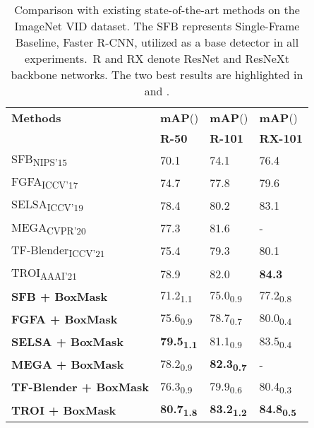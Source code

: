 \documentclass[10pt,twocolumn,letterpaper]{article}
\begin{document}
\begin{table}
\begin{center}
    \small
    \begin{tabular}{llll}
    \toprule\noalign{\smallskip}
      \textbf{Methods} &  \textbf{mAP}() &  \textbf{mAP}() &  \textbf{mAP}()\\ &\textbf{R-50} &\textbf{R-101} &\textbf{RX-101} \\
    \noalign{\smallskip}
    \hline
    SFB\textsubscript{NIPS'15}\cite{ren2015faster}  & 70.1 & 74.1 & 76.4 \\
    FGFA\textsubscript{ICCV'17}\cite{zhu2017flow}  & 74.7& 77.8 & 79.6 \\
    SELSA\textsubscript{ICCV'19}\cite{wu2019sequence}  & 78.4 & 80.2 &  83.1\\
    MEGA\textsubscript{CVPR'20}\cite{chen2020memory}  & 77.3 & 81.6 & - \\
    TF-Blender\textsubscript{ICCV'21}\cite{cui2021tf}  & 75.4 & 79.3 &  80.1\\
    TROI\textsubscript{AAAI'21}\cite{gong2021temporal}  &78.9 & 82.0 & \textbf{\color{blue}84.3}\\
    \hline
    
    \textbf{SFB + BoxMask}& 71.2\textsubscript{1.1} & 75.0\textsubscript{0.9} & 77.2\textsubscript{0.8} \\
    \textbf{FGFA + BoxMask }& 75.6\textsubscript{0.9} & 78.7\textsubscript{0.7} & 80.0\textsubscript{0.4}\\
    \textbf{SELSA + BoxMask }& \textbf{\color{blue}79.5\textsubscript{1.1}} & 81.1\textsubscript{0.9} & 83.5\textsubscript{0.4}\\
    \textbf{MEGA + BoxMask }& 78.2\textsubscript{0.9}& \textbf{\color{blue}82.3\textsubscript{0.7}} & - \\
    \textbf{TF-Blender + BoxMask }& 76.3\textsubscript{0.9} & 79.9\textsubscript{0.6} & 80.4\textsubscript{0.3}\\
    \textbf{TROI + BoxMask }& \textbf{\color{red}80.7\textsubscript{1.8}}& \textbf{\color{red}83.2\textsubscript{1.2}} & \textbf{\color{red}84.8\textsubscript{0.5}}\\
    
    \bottomrule
    \end{tabular}
    \caption{\color{black} Comparison with existing state-of-the-art methods on the ImageNet VID dataset. The SFB represents Single-Frame Baseline, Faster R-CNN, utilized as a base detector in all experiments.~R and RX denote ResNet and ResNeXt backbone networks. The two best results are highlighted in \color{red}{red} \color{black} and \color{blue}{blue}\color{black}.}
    \label{table:sota_comparison}
\end{center}
\vspace{-20pt}
\end{table}
\end{document}
